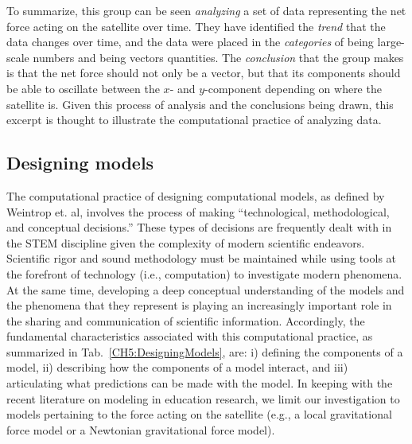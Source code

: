 \documentclass{msuphddissertation}
\begin{document}
\begin{doublespace}
To summarize, this group can be seen \textit{analyzing} a set of data representing the net force acting on the satellite over time.  They have identified the \textit{trend} that the data changes over time, and the data were placed in the \textit{categories} of being large-scale numbers and being vectors quantities.  The \textit{conclusion} that the group makes is that the net force should not only be a vector, but that its components should be able to oscillate between the $x$- and $y$-component depending on where the satellite is.  Given this process of analysis and the conclusions being drawn, this excerpt is thought to illustrate the computational practice of analyzing data.

%
%
%
%
%
%
%
%
%
%
%
%
%
%
%
%

\subsection{Designing models}\label{CH5:SecDesigingModels}

The computational practice of designing computational models, as defined by Weintrop et. al, involves the process of making ``technological, methodological, and conceptual decisions.''  These types of decisions are frequently dealt with in the STEM discipline given the complexity of modern scientific endeavors.  Scientific rigor and sound methodology must be maintained while using tools at the forefront of technology (i.e., computation) to investigate modern phenomena.  At the same time, developing a deep conceptual understanding of the models and the phenomena that they represent is playing an increasingly important role in the sharing and communication of scientific information.  Accordingly, the fundamental characteristics associated with this computational practice, as summarized in Tab.~\ref{CH5:DesigningModels}, are: i) defining the components of a model, ii) describing how the components of a model interact, and iii) articulating what predictions can be made with the model.  In keeping with the recent literature on modeling in education research, we limit our investigation to models pertaining to the force acting on the satellite (e.g., a local gravitational force model or a Newtonian gravitational force model).


\end{doublespace}
\end{document}
